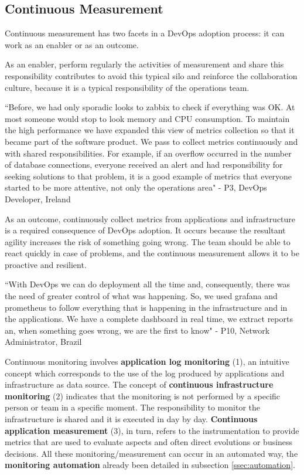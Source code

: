 \subsection{Continuous Measurement}
Continuous measurement has two facets in a DevOps adoption process: it can work
as an enabler or as an outcome.

As an enabler, perform regularly the activities of measurement and share this
responsibility contributes to avoid this typical silo and reinforce the
collaboration culture, because it is a typical responsibility of the operations
team.

``Before, we had only sporadic looks to zabbix to check if everything was OK.
At most someone would stop to look memory and CPU consumption. To maintain the
high performance we have expanded this view of metrics collection so that it
became part of the software product. We pass to collect metrics continuously
and with shared responsibilities. For example, if an overflow occurred in the
number of database connections, everyone received an alert and had
responsibility for seeking solutions to that problem, it is a good example of
metrics that everyone started to be more attentive, not only the operations
area" - P3, DevOps Developer, Ireland

As an outcome, continuously collect metrics from applications and
infrastructure is a required consequence of DevOps adoption. It occurs because
the resultant agility increases the risk of something going wrong. The team
should be able to react quickly in case of problems, and the continuous
measurement allows it to be proactive and resilient.

``With DevOps we can do deployment all the time and, consequently, there was
the need of greater control of what was happening. So, we used grafana and
prometheus to follow everything that is happening in the infrastructure and in
the applications. We have a complete dashboard in real time, we extract reports
an, when something goes wrong, we are the first to know" - P10, Network
Administrator, Brazil

Continuous monitoring involves \textbf{application log monitoring} (1), an
intuitive concept which corresponds to the use of the log produced by
applications and infrastructure as data source. The concept of
\textbf{continuous infrastructure monitoring} (2) indicates that the monitoring
is not performed by a specific person or team in a specific moment. The
responsibility to monitor the infrastructure is shared and it is executed in
day by day. \textbf{Continuous application measurement} (3), in turn, refers to
the instrumentation to provide metrics that are used to evaluate aspects and
often direct evolutions or business decisions. All these monitoring/measurement
can occur in an automated way, the \textbf{monitoring automation} already been
detailed in subsection \ref{ssec:automation}.

